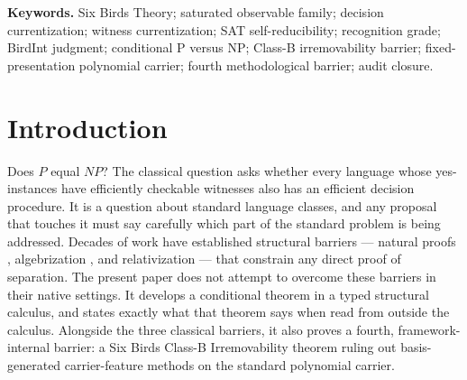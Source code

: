 \documentclass[11pt]{article}
\newcommand{\CSLSATHidden}{\Gamma_{\textsc{csl-sat-hidden}}}
\theoremstyle{definition}
\begin{document}
\begin{abstract}
Irremovability theorem then rules out one route to removing the
hypothesis: no basis-generated Class-B carrier-feature method can
remove the residual, except by leaving the basis or importing a
target-equivalent lower bound.  The
barrier is analogous in role to relativization, natural proofs, and
algebrization, but methodologically distinct and internal to Six
Birds.  The paper does not claim an unconditional standard-ZFC separation of
\(P\) and \(NP\), derivability of \(\CSLSATHidden\) from framework
primitives, circumvention of the classical barriers in their native
senses, absolute irremovability of \(\CSLSATHidden\), a barrier
against methods using carrier structure outside the standard basis,
or any AOR-membership claim outside the stated formed-SAT,
standard-basis scope.
\end{abstract}

\medskip
\noindent\textbf{Keywords.} Six Birds Theory; saturated observable family; decision currentization; witness currentization; SAT self-reducibility; recognition grade; BirdInt judgment; conditional P versus NP; Class-B irremovability barrier; fixed-presentation polynomial carrier; fourth methodological barrier; audit closure.



\section{Introduction}
\label{sec:intro}

Does \(P\) equal \(NP\)?  The classical question asks whether every
language whose yes-instances have efficiently checkable witnesses also
has an efficient decision procedure.  It is a question about standard
language classes, and any proposal that touches it must say carefully
which part of the standard problem is being addressed.  Decades of
work have established structural barriers --- natural proofs
\citep{RazborovRudich1997NaturalProofs}, algebrization
\citep{AaronsonWigderson2009Algebrization}, and relativization
\citep{BakerGillSolovay1975Relativization} --- that constrain any
direct proof of separation.  The present paper does not attempt to overcome these
barriers in their native settings.  It develops a conditional theorem
in a typed structural calculus, and states exactly what that theorem
says when read from outside the calculus.  Alongside the three
classical barriers, it also proves a fourth, framework-internal barrier:
a Six Birds Class-B Irremovability theorem ruling out basis-generated
carrier-feature methods on the standard polynomial carrier.
\end{document}
